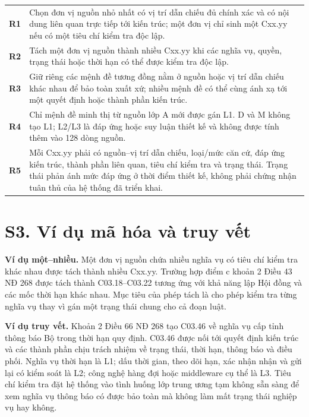 \documentclass[a4paper,11pt]{article}
\begin{document}
\begin{table}[ht]
\centering
\small
\begin{tabularx}{\textwidth}{>{\bfseries}p{0.7cm}X}
\toprule
R1 & Chọn đơn vị nguồn nhỏ nhất có vị trí dẫn chiếu đủ chính xác và có nội dung liên quan trực tiếp tới kiến trúc; một đơn vị chỉ sinh một Cxx.yy nếu có một tiêu chí kiểm tra độc lập.\\
R2 & Tách một đơn vị nguồn thành nhiều Cxx.yy khi các nghĩa vụ, quyền, trạng thái hoặc thời hạn có thể được kiểm tra độc lập.\\
R3 & Giữ riêng các mệnh đề tương đồng nằm ở nguồn hoặc vị trí dẫn chiếu khác nhau để bảo toàn xuất xứ; nhiều mệnh đề có thể cùng ánh xạ tới một quyết định hoặc thành phần kiến trúc.\\
R4 & Chỉ mệnh đề minh thị từ nguồn lớp A mới được gán L1. D và M không tạo L1; L2/L3 là đáp ứng hoặc suy luận thiết kế và không được tính thêm vào 128 dòng nguồn.\\
R5 & Mỗi Cxx.yy phải có nguồn--vị trí dẫn chiếu, loại/mức căn cứ, đáp ứng kiến trúc, thành phần liên quan, tiêu chí kiểm tra và trạng thái. Trạng thái phản ánh mức đáp ứng ở thời điểm thiết kế, không phải chứng nhận tuân thủ của hệ thống đã triển khai.\\
\bottomrule
\end{tabularx}
\end{table}

\section*{S3. Ví dụ mã hóa và truy vết}
\textbf{Ví dụ một--nhiều.} Một đơn vị nguồn chứa nhiều nghĩa vụ có tiêu chí kiểm tra khác nhau được tách thành nhiều Cxx.yy. Trường hợp điểm c khoản 2 Điều 43 NĐ 268 được tách thành C03.18--C03.22 tương ứng với khả năng lập Hội đồng và các mốc thời hạn khác nhau. Mục tiêu của phép tách là cho phép kiểm tra từng nghĩa vụ thay vì gán một trạng thái chung cho cả đoạn luật.

\textbf{Ví dụ truy vết.} Khoản 2 Điều 66 NĐ 268 tạo C03.46 về nghĩa vụ cấp tỉnh thông báo Bộ trong thời hạn quy định. C03.46 được nối tới quyết định kiến trúc và các thành phần chịu trách nhiệm về trạng thái, thời hạn, thông báo và điều phối. Nghĩa vụ thời hạn là L1; dấu thời gian, theo dõi hạn, xác nhận nhận và gửi lại có kiểm soát là L2; công nghệ hàng đợi hoặc middleware cụ thể là L3. Tiêu chí kiểm tra đặt hệ thống vào tình huống lớp trung ương tạm không sẵn sàng để xem nghĩa vụ thông báo có được bảo toàn mà không làm mất trạng thái nghiệp vụ hay không.
\end{document}
